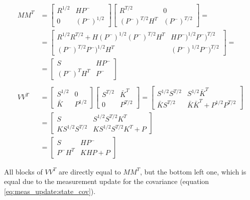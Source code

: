 \documentclass{article}
\begin{document}
\begin{equation}
\begin{split}
    MM^T &= \begin{bmatrix} R^{1/2} & HP^- \\ 0 & (P^-)^{1/2} \end{bmatrix}\begin{bmatrix} R^{T/2} & 0 \\ (P^-)^{T/2}H^T & (P^-)^{T/2} \end{bmatrix}= \\
    &=\begin{bmatrix} R^{1/2}R^{T/2} + H(P^-)^{1/2}(P^-)^{T/2}H^T & HP^-)^{1/2}P^-)^{T/2} \\ (P^-)^{T/2}P^-)^{1/2}H^T & (P^-)^{1/2}P^-)^{T/2} \end{bmatrix} = \\
    &=\begin{bmatrix}S & HP^- \\ (P^-)^TH^T & P^- \end{bmatrix} \\
    \\
    VV^T & = \begin{bmatrix} S^{1/2} & 0 \\ \bar{K} & P^{1/2} \end{bmatrix}\begin{bmatrix} S^{T/2} & \bar{K}^T \\ 0 & P^{T/2} \end{bmatrix} = \begin{bmatrix} S^{1/2}S^{T/2} & S^{1/2}\bar{K}^T \\ \bar{K}S^{T/2} & \bar{K}\bar{K}^T + P^{1/2}P^{T/2} \end{bmatrix}\\
     & = \begin{bmatrix} S & S^{1/2}S^{T/2}K^T \\ KS^{1/2}S^{T/2} & KS^{1/2}S^{T/2}K^T + P\end{bmatrix} \\
     & = \begin{bmatrix} S & HP^- \\ P^-H^T & KHP + P\end{bmatrix}
\end{split}
\end{equation}

All blocks of $VV^T$ are directly equal to $MM^T$, but the bottom left one, which is equal due to the measurement update for the covariance (equation \ref{eq:meas_update:state_cov}).
\end{document}
